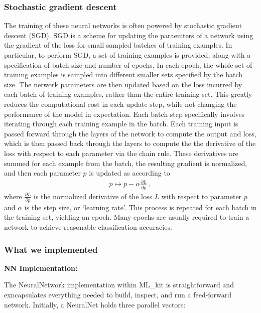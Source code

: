 \subsubsection{Stochastic gradient descent}
The training of these neural networks is often powered by stochastic gradient descent (SGD).
SGD is a scheme for updating the paraemters of a network using the gradient of the loss for small sampled batches of training examples.
In particular, to perform SGD, a set of training examples is provided, along with a specification of batch size and number of epochs.
In each epoch, the whole set of training examples is sampled into different smaller sets specified by the batch size.
The network parameters are then updated based on the loss incurred by each batch of training examples, rather than the entire training set.
This greatly reduces the computational cost in each update step, while not changing the performance of the model in expectation.
Each batch step specifically involves iterating through each training example in the batch.
Each training input is passed forward through the layers of the network to compute the output and loss, which is then passed back through the layers to compute the the derivative of the loss with respect to each parameter via the chain rule.
These derivatives are summed for each example from the batch, the resulting gradient is normalized, and then each parameter $p$ is updated as according to
\begin{equation*}
  \begin{aligned}
    p \mapsto p - \alpha\frac{\partial L}{\partial p} ~,
  \end{aligned}
\end{equation*}
where $\frac{\partial L}{\partial p}$ is the normalized derivative of the loss $L$ with respect to parameter $p$ and $\alpha$ is the step size, or `learning rate'.
This process is repeated for each batch in the training set, yielding an epoch.
Many epochs are usually required to train a network to achieve reasonable classification accuracies.

\subsubsection{What we implemented}



\begin{center}
 \textbf{NN Implementation:}
\end{center}

The NeuralNetwork implementation within ML_kit is straightforward and exncapsulates everything needed to build, inspect, and run a feed-forward network.
Initially, a NeuralNet holds three parallel vectors: 

